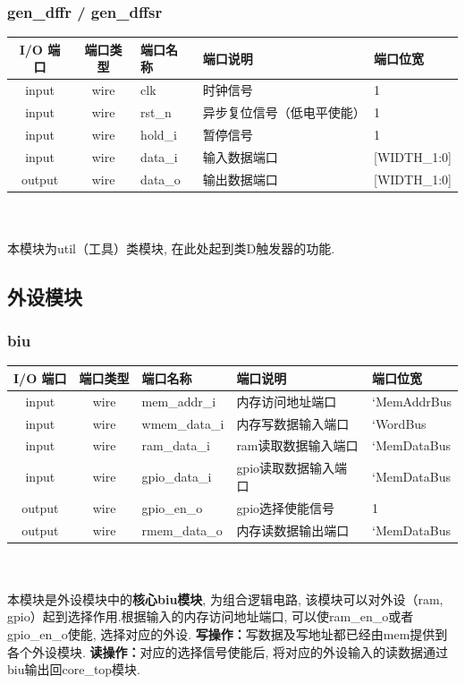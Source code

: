 \documentclass[lang=cn,11pt,a4paper,chinesefont=founder]{elegantpaper}
\begin{document}
\subsubsection{gen\_dffr / gen\_dffsr }
\begin{tabular}{cclll}
    \toprule
    I/O 端口 & 端口类型 & 端口名称 & 端口说明                   & 端口位宽     \\
    \midrule
    input    & wire     & clk      & 时钟信号                   & 1            \\
    input    & wire     & rst\_n   & 异步复位信号（低电平使能） & 1            \\
    input    & wire     & hold\_i  & 暂停信号                   & 1            \\
    input    & wire     & data\_i  & 输入数据端口               & [WIDTH\_1:0] \\

    output   & wire     & data\_o  & 输出数据端口               & [WIDTH\_1:0] \\
    \bottomrule
\end{tabular}\\
\\
本模块为util（工具）类模块, 在此处起到类D触发器的功能. 
\subsection{外设模块}
\subsubsection{biu}
\begin{tabular}{cclll}
    \toprule
    I/O 端口 & 端口类型 & 端口名称      & 端口说明             & 端口位宽    \\
    \midrule
    input    & wire     & mem\_addr\_i  & 内存访问地址端口     & `MemAddrBus \\
    input    & wire     & wmem\_data\_i & 内存写数据输入端口   & `WordBus    \\
    input    & wire     & ram\_data\_i  & ram读取数据输入端口  & `MemDataBus \\
    input    & wire     & gpio\_data\_i & gpio读取数据输入端口 & `MemDataBus \\

    output   & wire     & gpio\_en\_o   & gpio选择使能信号     & 1           \\
    output   & wire     & rmem\_data\_o & 内存读数据输出端口   & `MemDataBus \\
    \bottomrule
\end{tabular}\\
\\
本模块是外设模块中的\textbf{核心biu模块}, 为组合逻辑电路, 该模块可以对外设（ram, gpio）起到选择作用.根据输入的内存访问地址端口, 可以使ram\_en\_o或者gpio\_en\_o使能, 选择对应的外设. \textbf{写操作：}写数据及写地址都已经由mem提供到各个外设模块. \textbf{读操作：}对应的选择信号使能后, 将对应的外设输入的读数据通过biu输出回core\_top模块. 
\end{document}
